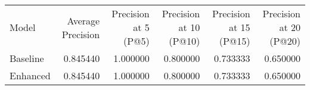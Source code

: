 \begin{tabular}{lrrrrr}
Model & Average Precision & Precision at 5 (P@5) & Precision at 10 (P@10) & Precision at 15 (P@15) & Precision at 20 (P@20) \\
Baseline & 0.845440 & 1.000000 & 0.800000 & 0.733333 & 0.650000 \\
Enhanced & 0.845440 & 1.000000 & 0.800000 & 0.733333 & 0.650000 \\
\end{tabular}
